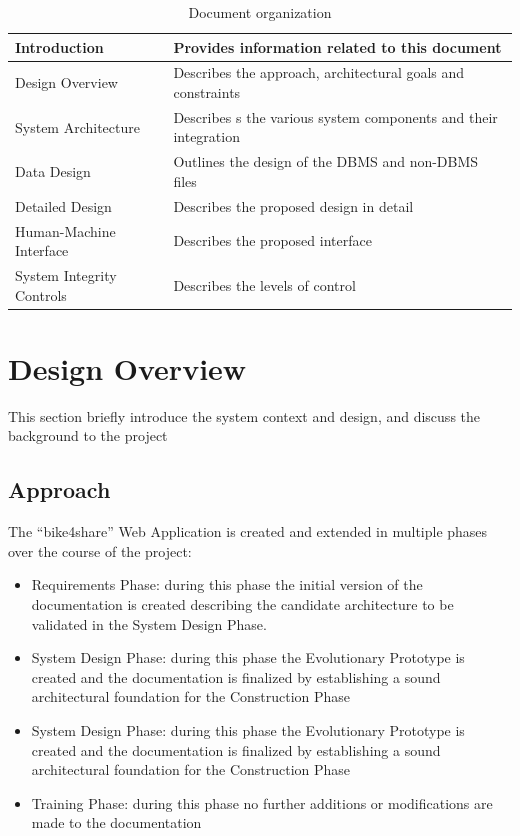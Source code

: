\documentclass{article}
\begin{document}
\begin{table} [H]
    \begin{center}
        \begin{tabular}{|l|p{}|}
            \hline
            Introduction &   Provides information related to this document         \\
            \hline
            Design Overview &  
            Describes the approach, architectural goals and constraints \\
            \hline
            System Architecture &  
            Describes s the various system components and their integration \\
            \hline
            Data Design & Outlines the design of the DBMS and non-DBMS files \\
            \hline
            Detailed Design & Describes the proposed design in detail 
            \\
            \hline
             Human-Machine Interface & Describes the proposed interface
            \\
            \hline
            System Integrity Controls
             & Describes the levels of control
            \\
            \hline
        \end{tabular}
    \end{center}
\label{tab:sec}
\caption{Document organization}
\end{table}

\section{Design Overview}
This section briefly introduce the system context and design, and discuss the background to the project
\subsection{Approach}
The “bike4share” Web Application is created and extended in multiple phases over the course of the project:
\begin{itemize}
    \item Requirements Phase: during this phase the initial version of the documentation is created describing the candidate architecture to be validated in the System Design Phase.
    \item System Design Phase: during this phase the Evolutionary Prototype is created and the documentation is finalized by establishing a sound architectural foundation for the Construction Phase
    \item System Design Phase: during this phase the Evolutionary Prototype is created and the documentation is finalized by establishing a sound architectural foundation for the Construction Phase
    \item Training Phase: during this phase no further additions or modifications are made to the documentation
\end{itemize}
\end{document}
